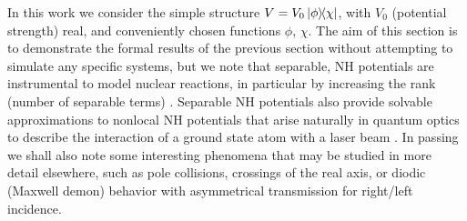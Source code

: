 In this work we consider the simple structure
$V=V_0 \ketbra{\phi}{\chi}$, with $V_0$ (potential strength) real, and conveniently chosen functions $\phi$, $\chi$.
The aim of this section is to demonstrate the formal results of the previous section without attempting to simulate any specific systems, but we note that separable, NH potentials are instrumental to model nuclear reactions, in particular  by increasing the rank (number of separable terms) \cite{Hlophe2017}.
Separable NH potentials also provide solvable approximations to nonlocal NH potentials that arise naturally in quantum optics to describe the interaction of a ground state atom with a laser beam \cite{Ruschhaupt2004a}.
%
%
In passing we shall also note some interesting phenomena that may be studied in more detail elsewhere, such as pole collisions, crossings of
the real axis, or diodic (Maxwell demon) behavior with asymmetrical transmission for right/left incidence.
%
%


